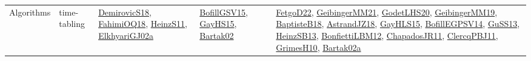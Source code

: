 {\begin{longtable}{lp{3cm}>{\raggedright}p{6cm}>{\raggedright}p{6cm}p{8cm}}
Algorithms & time-tabling & \href{papers/DemirovicS18.pdf}{DemirovicS18}\cite{DemirovicS18}, \href{articles/FahimiOQ18.pdf}{FahimiOQ18}\cite{FahimiOQ18}, \href{papers/HeinzS11.pdf}{HeinzS11}\cite{HeinzS11}, \href{papers/ElkhyariGJ02a.pdf}{ElkhyariGJ02a}\cite{ElkhyariGJ02a} & \href{papers/BofillGSV15.pdf}{BofillGSV15}\cite{BofillGSV15}, \href{papers/GayHS15.pdf}{GayHS15}\cite{GayHS15}, \href{papers/Bartak02.pdf}{Bartak02}\cite{Bartak02} & \href{articles/FetgoD22.pdf}{FetgoD22}\cite{FetgoD22}, \href{papers/GeibingerMM21.pdf}{GeibingerMM21}\cite{GeibingerMM21}, \href{papers/GodetLHS20.pdf}{GodetLHS20}\cite{GodetLHS20}, \href{papers/GeibingerMM19.pdf}{GeibingerMM19}\cite{GeibingerMM19}, \href{articles/BaptisteB18.pdf}{BaptisteB18}\cite{BaptisteB18}, \href{papers/AstrandJZ18.pdf}{AstrandJZ18}\cite{AstrandJZ18}, \href{papers/GayHLS15.pdf}{GayHLS15}\cite{GayHLS15}, \href{papers/BofillEGPSV14.pdf}{BofillEGPSV14}\cite{BofillEGPSV14}, \href{papers/GuSS13.pdf}{GuSS13}\cite{GuSS13}, \href{articles/HeinzSB13.pdf}{HeinzSB13}\cite{HeinzSB13}, \href{papers/BonfiettiLBM12.pdf}{BonfiettiLBM12}\cite{BonfiettiLBM12}, \href{papers/ChapadosJR11.pdf}{ChapadosJR11}\cite{ChapadosJR11}, \href{papers/ClercqPBJ11.pdf}{ClercqPBJ11}\cite{ClercqPBJ11}, \href{papers/GrimesH10.pdf}{GrimesH10}\cite{GrimesH10}, \href{papers/Bartak02a.pdf}{Bartak02a}\cite{Bartak02a}\\
\end{longtable}
}

